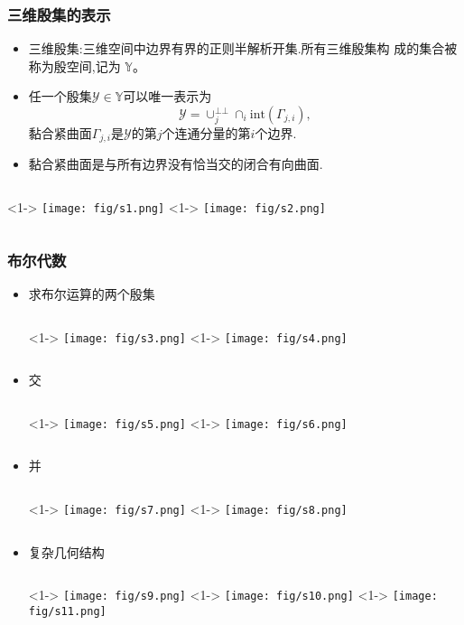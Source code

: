 \documentclass[UTF8]{ctexbeamer}	%
\theoremstyle{plain}
\theoremstyle{definition}
\theoremstyle{remark}
\numberwithin{equation}{section}
\begin{document}
\begin{frame}
    \frametitle{三维殷集的表示}
    \begin{itemize}
        \item 三维殷集:三维空间中边界有界的正则半解析开集.所有三维殷集构
        成的集合被称为殷空间,记为 $\mathbb{Y}$。
        \item 任一个殷集$\mathcal{Y} \in \mathbb{Y}$可以唯一表示为
        \[\mathcal{Y} = \cup_j^{\bot \bot} \cap_i \text{int}(\Gamma_{j, i}),\]
        黏合紧曲面$\Gamma_{j, i}$是$\mathcal{Y}$的第$j$个连通分量的第$i$个边界.
        \item 黏合紧曲面是与所有边界没有恰当交的闭合有向曲面.
    \end{itemize}
    \begin{columns}
        <1->
            \texttt{[image: fig/s1.png]}
        <1->
        \texttt{[image: fig/s2.png]}
    \end{columns}
\end{frame}

\begin{frame}
    \frametitle{布尔代数}
    \begin{itemize}
        \item 求布尔运算的两个殷集
        \begin{columns}
            <1->
                \texttt{[image: fig/s3.png]}
            <1->
            \texttt{[image: fig/s4.png]}
        \end{columns}
        \item 交
        \begin{columns}
            <1->
                \texttt{[image: fig/s5.png]}
            <1->
            \texttt{[image: fig/s6.png]}
        \end{columns}
    \end{itemize}
\end{frame}

\begin{frame}
    \begin{itemize}
        \item 并 \begin{columns}
            <1->
                \texttt{[image: fig/s7.png]}
            <1->
            \texttt{[image: fig/s8.png]}
        \end{columns}
        \item 复杂几何结构
        \begin{columns}
            <1->
                \texttt{[image: fig/s9.png]}
            <1->
            \texttt{[image: fig/s10.png]}
            <1->
            \texttt{[image: fig/s11.png]}
        \end{columns}
    \end{itemize}
\end{frame}
\end{document}
